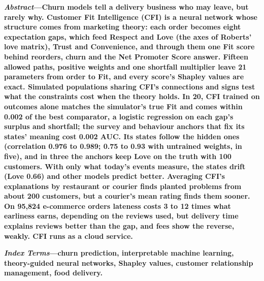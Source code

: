 \documentclass[10pt,twocolumn,letterpaper]{article}
\begin{document}

\noindent\textbf{\textit{Abstract}---Churn models tell a delivery business who may leave, but rarely why. Customer Fit Intelligence (CFI) is a neural network whose structure comes from marketing theory: each order becomes eight expectation gaps, which feed Respect and Love (the axes of Roberts' love matrix), Trust and Convenience, and through them one Fit score behind reorders, churn and the Net Promoter Score answer. Fifteen allowed paths, positive weights and one shortfall multiplier leave 21 parameters from order to Fit, and every score's Shapley values are exact. Simulated populations sharing CFI's connections and signs test what the constraints cost when the theory holds. In 20, CFI trained on outcomes alone matches the simulator's true Fit and comes within 0.002 of the best comparator, a logistic regression on each gap's surplus and shortfall; the survey and behaviour anchors that fix its states' meaning cost 0.002 AUC. Its states follow the hidden ones (correlation 0.976 to 0.989; 0.75 to 0.93 with untrained weights, in five), and in three the anchors keep Love on the truth with 100 customers. With only what today's events measure, the states drift (Love 0.66) and other models predict better. Averaging CFI's explanations by restaurant or courier finds planted problems from about 200 customers, but a courier's mean rating finds them sooner. On 95,824 e-commerce orders lateness costs 3 to 12 times what earliness earns, depending on the reviews used, but delivery time explains reviews better than the gap, and fees show the reverse, weakly. CFI runs as a cloud service.}

\vspace{6pt}
\noindent\textbf{\textit{Index Terms}---churn prediction, interpretable machine learning, theory-guided neural networks, Shapley values, customer relationship management, food delivery.}
\end{document}
